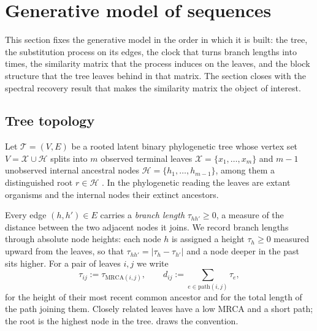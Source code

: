 \section{Generative model of sequences}\label{sec:model}

This section fixes the generative model in the order in which it is built: the
tree, the substitution process on its edges, the clock that turns branch lengths
into times, the similarity matrix that the process induces on the leaves, and the
block structure that the tree leaves behind in that matrix. The section closes with
the spectral recovery result that makes the similarity matrix the object of
interest.

\subsection{Tree topology}\label{sec:model-topology}

Let $\mathcal{T} = (V, E)$ be a rooted latent binary phylogenetic tree whose vertex
set $V = \mathcal{X} \cup \mathcal{H}$ splits into $m$ observed terminal leaves
$\mathcal{X} = \{x_1, \dots, x_m\}$ and $m-1$ unobserved internal ancestral nodes
$\mathcal{H} = \{h_1, \dots, h_{m-1}\}$, among them a distinguished root
$r \in \mathcal{H}$ \cite{aizenbud2023spectral}. In the phylogenetic reading the
leaves are extant organisms and the internal nodes their extinct ancestors.

Every edge $(h, h') \in E$ carries a \emph{branch length} $\tau_{hh'} \ge 0$, a
measure of the distance between the two adjacent nodes it joins. We record branch
lengths through absolute node heights: each node $h$ is assigned a height
$\tau_h \ge 0$ measured upward from the leaves, so that
$\tau_{hh'} = |\tau_h - \tau_{h'}|$ and a node deeper in the past sits higher. For
a pair of leaves $i, j$ we write
\begin{equation}\label{eq:mrca_height}
   \tau_{ij} := \tau_{\mathrm{MRCA}(i,j)},
   \qquad
   d_{ij} := \sum_{e \in \mathrm{path}(i,j)} \tau_e ,
\end{equation}
for the height of their most recent common ancestor and for the total length of the
path joining them. Closely related leaves have a low MRCA and a short path; the
root is the highest node in the tree.  draws the
convention.


